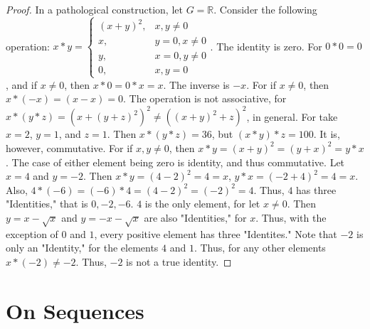 \documentclass[crop=false,class=book,oneside]{standalone}
\begin{document}
            \begin{proof}
            In a pathological construction, let $G=\mathbb{R}$. Consider the following operation:
            $x* y = \begin{cases} (x+y)^2, & x,y\ne 0 \\ x, & y=0,x\ne 0 \\ y, & x=0,y\ne 0 \\ 0, & x,y=0 \end{cases}$.
            The identity is zero. For $0*0 = 0$, and if $x\ne 0$, then $x*0 = 0*x = x$. The inverse is $-x$. For if $x\ne 0$, then $x*(-x) = (x-x)=0$. The operation is not associative, for $x*(y*z) = (x+(y+z)^2)^2 \ne ((x+y)^2+z)^2$, in general. For take $x=2$, $y=1$, and $z=1$. Then $x*(y*z) = 36$, but $(x*y)*z = 100$. It is, however, commutative. For if $x,y \ne 0$, then $x*y = (x+y)^2 = (y+x)^2 = y*x$. The case of either element being zero is identity, and thus commutative. Let $x=4$ and $y=-2$. Then $x*y = (4-2)^2 = 4=x$, $y*x = (-2+4)^2 = 4 = x$. Also, $4*(-6) = (-6)*4 = (4-2)^2 = (-2)^2 = 4$. Thus, $4$ has three "Identities," that is $0,-2,-6$. $4$ is the only element, for let $x \ne 0$. Then $y = x-\sqrt{x}$ and $y=-x-\sqrt{x}$ are also "Identities," for $x$. Thus, with the exception of $0$ and $1$, every positive element has three "Identites." Note that $-2$ is only an "Identity," for the elements $4$ and $1$. Thus, for any other elements $x*(-2) \ne -2$. Thus, $-2$ is not a true identity.
            \end{proof}
        \section{On Sequences}
\end{document}

